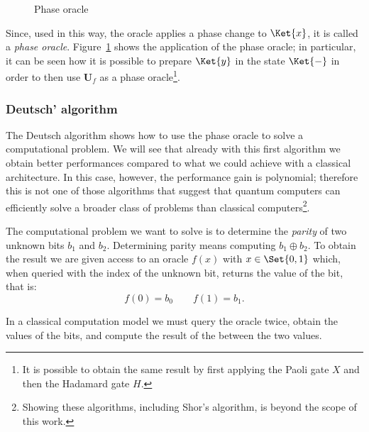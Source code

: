 \begin{figure}
	\centering
	\vspace{.2cm}
	\caption{Phase oracle}
	\label{fig:phase_oracle}
\end{figure}
Since, used in this way, the oracle applies a phase change to $\Ket{x}$, it is called a \emph{phase oracle}. Figure~\ref{fig:phase_oracle} shows the application of the phase oracle; in particular, it can be seen how it is possible to prepare $\Ket{y}$ in the state $\Ket{-}$ in order to then use $\mathbf{U}_f$ as a phase oracle\footnote{It is possible to obtain the same result by first applying the Paoli gate $X$ and then the Hadamard gate $H$.}.

\subsubsection*{Deutsch' algorithm}
The Deutsch algorithm shows how to use the phase oracle to solve a computational problem. We will see that already with this first algorithm we obtain better performances compared to what we could achieve with a classical architecture. In this case, however, the performance gain is polynomial; therefore this is not one of those algorithms that suggest that quantum computers can efficiently solve a broader class of problems than classical computers\footnote{Showing these algorithms, including Shor's algorithm, is beyond the scope of this work.}.

The computational problem we want to solve is to determine the \emph{parity} of two unknown bits $b_1$ and $b_2$. Determining parity means computing $b_1 \oplus b_2$. To obtain the result we are given access to an oracle $f(x)$ with $x \in \Set{0,1}$ which, when queried with the index of the unknown bit, returns the value of the bit, that is:
\[
f(0) = b_0 \qquad f(1) = b_1.
\]

In a classical computation model we must query the oracle twice, obtain the values of the bits, and compute the result of the  between the two values.

